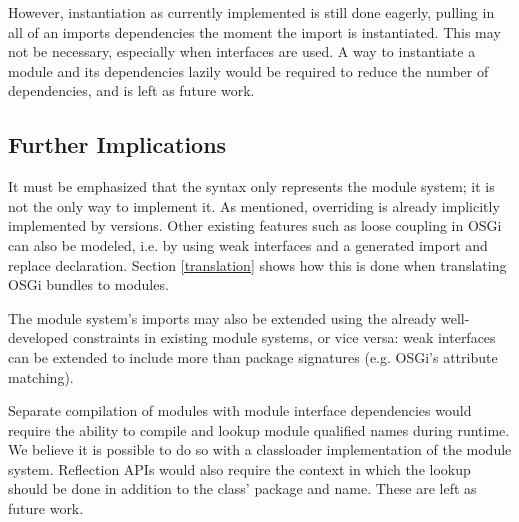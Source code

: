 However, instantiation as currently implemented is still done eagerly, pulling in all
of an imports dependencies the moment the import is instantiated. This may not be necessary,
especially when interfaces are used. A way to instantiate a module and its dependencies 
lazily would be required to reduce the number of dependencies, and is left as future work.

\subsection{Further Implications}

It must be emphasized that the syntax only represents the module system; it is not the only way
to implement it. As mentioned, overriding is already implicitly implemented
by versions. Other existing features such as loose coupling in OSGi can
also be modeled, i.e. by using weak interfaces and a generated import and replace
declaration. Section \ref{translation} shows how this is done when translating OSGi bundles to modules.

The module system's imports may also be extended using the already well-developed
constraints in existing module systems, or vice versa: weak interfaces can be extended
to include more than package signatures (e.g. OSGi's attribute matching). 

Separate compilation of modules with module interface dependencies would require
the ability to compile and lookup module qualified names during runtime. We believe
it is possible to do so with a classloader implementation of the module system. Reflection
APIs would also require the context in which the lookup should be done in addition to
the class' package and name. These are left as future work.

